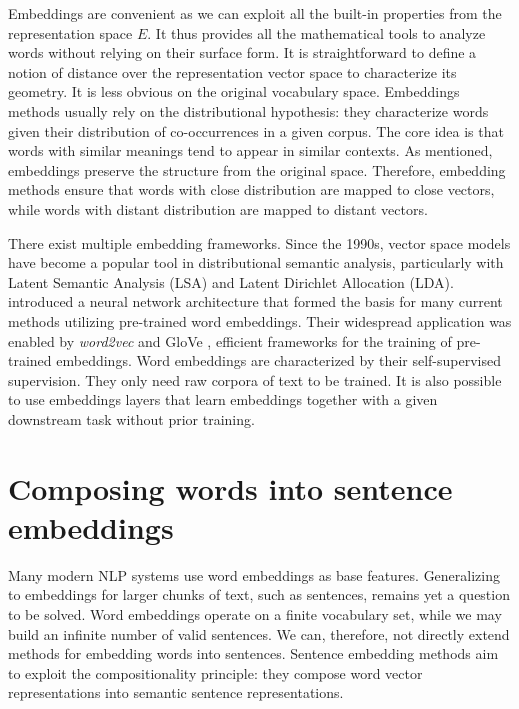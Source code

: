 Embeddings are convenient as we can exploit all the built-in properties from the representation space $E$. It thus provides all the mathematical tools to analyze words without relying on their surface form. It is straightforward to define a notion of distance over the representation vector space to characterize its geometry. It is less obvious on the original vocabulary space. Embeddings methods usually rely on the distributional hypothesis: they characterize words given their distribution of co-occurrences in a given corpus. The core idea is that words with similar meanings tend to appear in similar contexts. As mentioned, embeddings preserve the structure from the original space. Therefore, embedding methods ensure that words with close distribution are mapped to close vectors, while words with distant distribution are mapped to distant vectors.

There exist multiple embedding frameworks. Since the 1990s, vector space models have become a popular tool in distributional semantic analysis, particularly with Latent Semantic Analysis (LSA) and Latent Dirichlet Allocation (LDA). \textcite{collobert_08} introduced a neural network architecture that formed the basis for many current methods utilizing pre-trained word embeddings. Their widespread application was enabled by \textsl{word2vec} \parencite{mikolov_13a, mikolov_13b} and GloVe \parencite{pennington_14}, efficient frameworks for the training of pre-trained embeddings. Word embeddings are characterized by their self-supervised supervision. They only need raw corpora of text to be trained. It is also possible to use embeddings layers that learn embeddings together with a given downstream task without prior training.

\section{Composing words into sentence embeddings}

Many modern NLP systems use word embeddings as base features. Generalizing to embeddings for larger chunks of text, such as sentences, remains yet a question to be solved. Word embeddings operate on a finite vocabulary set, while we may build an infinite number of valid sentences. We can, therefore, not directly extend methods for embedding words into sentences. Sentence embedding methods aim to exploit the compositionality principle: they compose word vector representations into semantic sentence representations.

